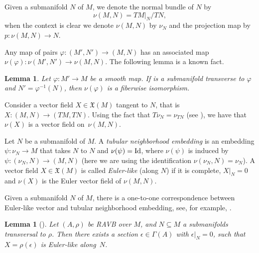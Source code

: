 \documentclass[pdftex]{sigma}
\numberwithin{equation}{section}
\newtheorem{Lemma}[Theorem]{Lemma}
\begin{document}
Given a submanifold $N$ of $M$, we denote the normal bundle of $N$ by
\[\nu(M,N)=TM|_{N}/TN,
\]
 when the context is clear we denote $\nu(M,N)$ by $\nu_N$ and the projection map by $p\colon \nu(M,N)\to N$.

Any map of pairs $\varphi\colon (M',N')\to (M,N)$ has an associated map $\nu(\varphi)\colon \nu(M',N')\to \nu(M,N).$
The following lemma is a known fact.
\begin{Lemma}\label{fiberwise_isom}
Let $\varphi\colon M'\to M$ be a smooth map. If  is a submanifold transverse to $\varphi$ and $N'=\varphi^{-1}(N)$, then $\nu(\varphi)$ is a fiberwise isomorphism.
\end{Lemma}
Consider a vector field $X\in \mathfrak{X}(M)$ tangent to $N$, that is $X\colon (M,N)\to (TM,TN)$. Using the fact that $T\nu_N=\nu_{TN}$ (see \cite[Appendix A]{bursztyn2019splitting}), we have that $\nu(X)$ is a vector field on~$\nu(M,N)$.
\begin{Definition}\label{defTN-EL}
Let $N$ be a submanifold of $M$. A {\em tubular neighborhood embedding} is an embedding
$\psi\colon \nu_N\to M$ that takes $N$ to $N$ and $\nu(\psi)={\rm Id}$, where $\nu(\psi)$ is induced by $\psi\colon (\nu_N,N)\to (M,N)$ (here we are using the identification $\nu(\nu_N,N)=\nu_N$).
A vector field $X\in\mathfrak{X}(M)$ is called {\em Euler-like} (along $N$) if it is complete, $X|_{N}=0$ and $\nu(X)$ is the Euler vector field of $\nu(M,N)$.
\end{Definition}
Given a submanifold $N$ of $M$, there is a one-to-one correspondence between Euler-like vector and tubular neighborhood embedding, see, for example, \cite{bursztyn2019splitting}.
\begin{Lemma}[{\cite[Lemma 3.9]{bursztyn2019splitting}}]\label{existence_esp_section}
Let $(A, \rho)$ be RAVB over $M$, and $N\subseteq M$ a submanifolds transversal to $\rho$.
Then there exists a section $\epsilon\in \Gamma(A)$ with $\epsilon|_N = 0$, such that $X = \rho(\epsilon)$ is Euler-like along~$N$.
\end{Lemma}
\end{document}
